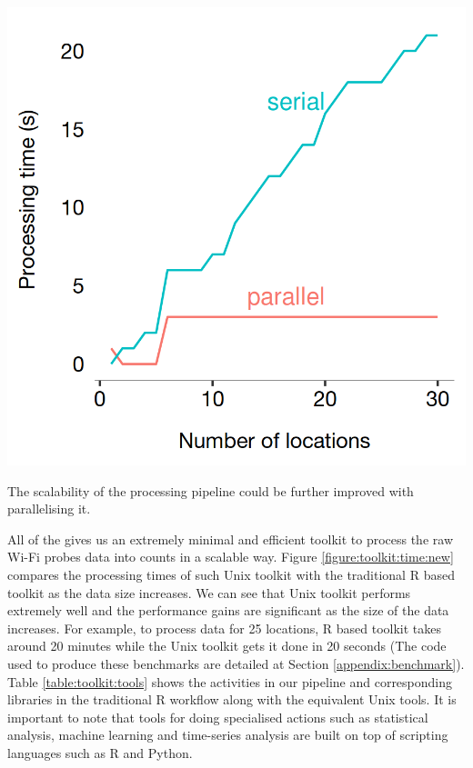 \begin{marginfigure}[2cm]
  \includegraphics[trim={0 0 0 0},clip]{images/processing-times-parallel.png}
  \caption{The scalability of the processing pipeline could be further improved with parallelising it.}
  \label{figure:toolkit:time:parallel}
\end{marginfigure}

All of the gives us an extremely minimal and efficient toolkit to process the raw Wi-Fi probes data into counts in a scalable way.
Figure \ref{figure:toolkit:time:new} compares the processing times of such Unix toolkit with the traditional R based toolkit as the data size increases.
We can see that Unix toolkit performs extremely well and the performance gains are significant as the size of the data increases.
For example, to process data for 25 locations, R based toolkit takes around 20 minutes while the Unix toolkit gets it done in 20 seconds 
(The code used to produce these benchmarks are detailed at Section \ref{appendix:benchmark}).
Table \ref{table:toolkit:tools} shows the activities in our pipeline and corresponding libraries in the traditional R workflow along with the equivalent Unix tools.
It is important to note that tools for doing specialised actions such as statistical analysis, machine learning and time-series analysis are built on top of scripting languages such as R and Python.

